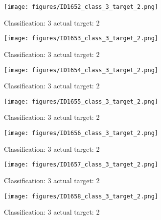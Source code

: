 \begin{figure}[h!]
\begin{center}
\texttt{[image: figures/ID1652\_class\_3\_target\_2.png]}
\end{center}
\caption{ Classification: 3 actual target: 2}
\label{fig:ID1652_class_3_target_2}
\end{figure}
\begin{figure}[h!]
\begin{center}
\texttt{[image: figures/ID1653\_class\_3\_target\_2.png]}
\end{center}
\caption{ Classification: 3 actual target: 2}
\label{fig:ID1653_class_3_target_2}
\end{figure}
\begin{figure}[h!]
\begin{center}
\texttt{[image: figures/ID1654\_class\_3\_target\_2.png]}
\end{center}
\caption{ Classification: 3 actual target: 2}
\label{fig:ID1654_class_3_target_2}
\end{figure}
\begin{figure}[h!]
\begin{center}
\texttt{[image: figures/ID1655\_class\_3\_target\_2.png]}
\end{center}
\caption{ Classification: 3 actual target: 2}
\label{fig:ID1655_class_3_target_2}
\end{figure}
\begin{figure}[h!]
\begin{center}
\texttt{[image: figures/ID1656\_class\_3\_target\_2.png]}
\end{center}
\caption{ Classification: 3 actual target: 2}
\label{fig:ID1656_class_3_target_2}
\end{figure}
\begin{figure}[h!]
\begin{center}
\texttt{[image: figures/ID1657\_class\_3\_target\_2.png]}
\end{center}
\caption{ Classification: 3 actual target: 2}
\label{fig:ID1657_class_3_target_2}
\end{figure}
\begin{figure}[h!]
\begin{center}
\texttt{[image: figures/ID1658\_class\_3\_target\_2.png]}
\end{center}
\caption{ Classification: 3 actual target: 2}
\label{fig:ID1658_class_3_target_2}
\end{figure}

